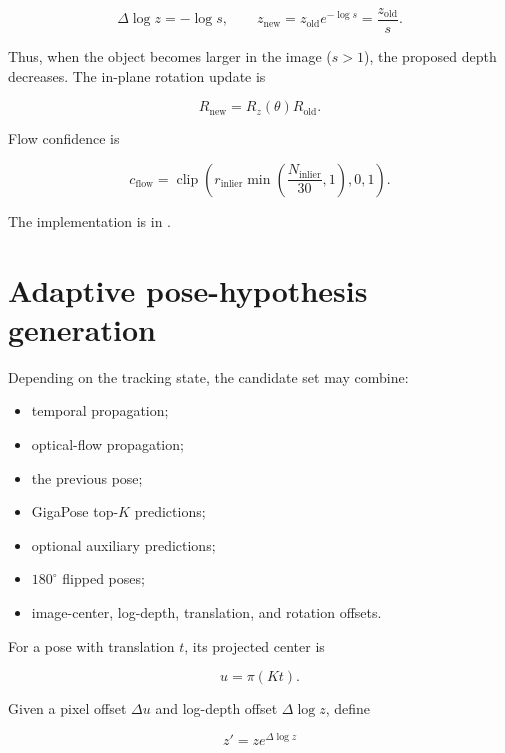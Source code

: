 \documentclass[11pt]{article}
\newcommand{\clip}{\operatorname{clip}}
\begin{document}
\begin{equation}
\Delta\log z=-\log s,
\qquad
z_{\mathrm{new}}=z_{\mathrm{old}}e^{-\log s}
=\frac{z_{\mathrm{old}}}{s}.
\end{equation}

Thus, when the object becomes larger in the image ($s>1$), the proposed depth
decreases. The in-plane rotation update is

\begin{equation}
R_{\mathrm{new}}=R_z(\theta)R_{\mathrm{old}}.
\end{equation}

Flow confidence is

\begin{equation}
c_{\mathrm{flow}}=\clip\left(
r_{\mathrm{inlier}}
\min\left(\frac{N_{\mathrm{inlier}}}{30},1\right),
0,1
\right).
\end{equation}

The implementation is in .

\section{Adaptive pose-hypothesis generation}

Depending on the tracking state, the candidate set may combine:

\begin{itemize}
    \item temporal propagation;
    \item optical-flow propagation;
    \item the previous pose;
    \item GigaPose top-$K$ predictions;
    \item optional auxiliary predictions;
    \item $180^\circ$ flipped poses;
    \item image-center, log-depth, translation, and rotation offsets.
\end{itemize}

For a pose with translation $t$, its projected center is

\begin{equation}
u=\pi(Kt).
\end{equation}

Given a pixel offset $\Delta u$ and log-depth offset $\Delta\log z$, define

\begin{equation}
z'=z e^{\Delta\log z}
\end{equation}
\end{document}
